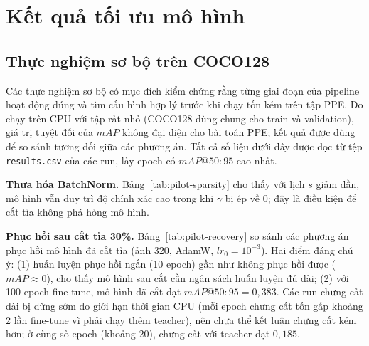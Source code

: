 \section{Kết quả tối ưu mô hình}

\subsection{Thực nghiệm sơ bộ trên COCO128}
\label{sec:pilot-results}

Các thực nghiệm sơ bộ có mục đích kiểm chứng rằng từng giai đoạn của pipeline
hoạt động đúng và tìm cấu hình hợp lý trước khi chạy tốn kém trên tập PPE. Do
chạy trên CPU với tập rất nhỏ (COCO128 dùng chung cho train và validation), giá
trị tuyệt đối của $mAP$ không đại diện cho bài toán PPE; kết quả được dùng để so
sánh tương đối giữa các phương án. Tất cả số liệu dưới đây được đọc từ tệp
\texttt{results.csv} của các run, lấy epoch có $mAP@50{:}95$ cao nhất.

\textbf{Thưa hóa BatchNorm.} Bảng~\ref{tab:pilot-sparsity} cho thấy với lịch
$s$ giảm dần, mô hình vẫn duy trì độ chính xác cao trong khi $\gamma$ bị ép về 0;
đây là điều kiện để cắt tỉa không phá hỏng mô hình.

\begin{table}[H]
\centering
\caption{Thực nghiệm thưa hóa BatchNorm trên COCO128 (CPU)}
\label{tab:pilot-sparsity}
\end{table}

\textbf{Phục hồi sau cắt tỉa 30\%.} Bảng~\ref{tab:pilot-recovery} so sánh các
phương án phục hồi mô hình đã cắt tỉa (ảnh 320, AdamW, $lr_0=10^{-3}$). Hai điểm
đáng chú ý: (1) huấn luyện phục hồi ngắn (10 epoch) gần như không phục hồi được
($mAP \approx 0$), cho thấy mô hình sau cắt cần ngân sách huấn luyện đủ dài;
(2) với 100 epoch fine-tune, mô hình đã cắt đạt $mAP@50{:}95 = 0{,}383$. Các run
chưng cất dài bị dừng sớm do giới hạn thời gian CPU (mỗi epoch chưng cất tốn gấp
khoảng 2 lần fine-tune vì phải chạy thêm teacher), nên chưa thể kết luận chưng cất
kém hơn; ở cùng số epoch (khoảng 20), chưng cất với teacher đạt $0{,}185$.

